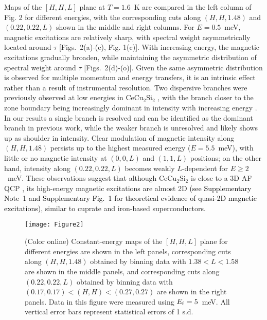 \documentclass[aps,prl,onecolumn,amsmath,amssymb,superscriptaddress]{revtex4}
\newcommand{\ys}{\textcolor{black}}
\begin{document}
Maps of the $[H,H,L]$ plane at $T=1.6$~K are compared in the left column of Fig. 2 for different energies, with the corresponding cuts along $(H,H,1.48)$ and $(0.22,0.22,L)$ shown in the middle and right columns. For $E=0.5$~meV, magnetic excitations are relatively sharp, with spectral weight asymmetrically located around $\tau$ [Figs.~2(a)-(c), Fig. 1(c)]. With increasing energy, the magnetic excitations gradually broaden, while maintaining the asymmetric distribution of spectral weight around $\tau$ [Figs.~2(d)-(o)]. Given the same asymmetric distribution is observed for multiple momentum and energy transfers, it is an intrinsic effect rather than a result of instrumental resolution. Two dispersive branches were previously observed at low energies in CeCu$_2$Si$_2$ \cite{OStockert2011}, with the branch closer to the zone boundary being increasingly dominant in intensity with increasing energy \cite{OStockert2011}. In our results a single branch is resolved and can be identified as the dominant branch in previous work, while the weaker branch is unresolved and likely shows up as shoulder in intensity. Clear modulation of magnetic intensity along $(H,H,1.48)$ persists up to the highest measured energy ($E=5.5$~meV), with little or no magnetic intensity at $(0,0,L)$ and $(1,1,L)$ positions; on the other hand, intensity along $(0.22,0.22,L)$ becomes weakly $L$-dependent for $E\geq2$~meV. These observations suggest that although CeCu$_2$Si$_2$ is close to a 3D AF QCP \cite{PGegenwart1998,JArndt2011}, its high-energy magnetic excitations are almost 2D \ys{(see Supplementary Note~1 and Supplementary Fig.~1 for theoretical evidence of quasi-2D magnetic excitations)}, similar to cuprate and iron-based superconductors. 


\begin{figure}[t]
	\texttt{[image: Figure2]}
	\caption{ 
		(Color online) Constant-energy maps of the $[H,H,L]$ plane for different energies are shown in the left panels, corresponding cuts along $(H,H,1.48)$ obtained by binning data with $1.38<L<1.58$ are shown in the middle panels, and corresponding cuts along $(0.22,0.22,L)$ obtained by binning data with $(0.17,0.17)<(H,H)<(0.27,0.27)$ are shown in the right panels. Data in this figure were measured using $E_{\rm f}=5$~meV. All vertical error bars represent statistical errors of 1 s.d.
	}
\end{figure}
\end{document}
